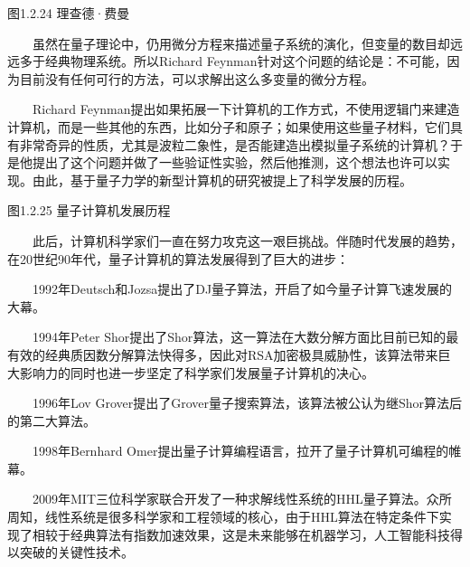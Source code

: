 \documentclass[a4paper,11pt,english]{sphinxmanual}
\begin{document}

\begin{center}图1.2.24 理查德·费曼
\end{center}
\sphinxAtStartPar
{}

\sphinxAtStartPar
  虽然在量子理论中，仍用微分方程来描述量子系统的演化，但变量的数目却远远多于经典物理系统。所以Richard Feynman针对这个问题的结论是：不可能，因为目前没有任何可行的方法，可以求解出这么多变量的微分方程。

\sphinxAtStartPar
{}

\sphinxAtStartPar
  Richard Feynman提出如果拓展一下计算机的工作方式，不使用逻辑门来建造计算机，而是一些其他的东西，比如分子和原子；如果使用这些量子材料，它们具有非常奇异的性质，尤其是波粒二象性，是否能建造出模拟量子系统的计算机？于是他提出了这个问题并做了一些验证性实验，然后他推测，这个想法也许可以实现。由此，基于量子力学的新型计算机的研究被提上了科学发展的历程。


\begin{center}图1.2.25 量子计算机发展历程
\end{center}
\sphinxAtStartPar
  此后，计算机科学家们一直在努力攻克这一艰巨挑战。伴随时代发展的趋势，在20世纪90年代，量子计算机的算法发展得到了巨大的进步：

\sphinxAtStartPar
  1992年Deutsch和Jozsa提出了D\sphinxhyphen{}J量子算法，开启了如今量子计算飞速发展的大幕。

\sphinxAtStartPar
  1994年Peter Shor提出了Shor算法，这一算法在大数分解方面比目前已知的最有效的经典质因数分解算法快得多，因此对RSA加密极具威胁性，该算法带来巨大影响力的同时也进一步坚定了科学家们发展量子计算机的决心。

\sphinxAtStartPar
  1996年Lov Grover提出了Grover量子搜索算法，该算法被公认为继Shor算法后的第二大算法。

\sphinxAtStartPar
  1998年Bernhard Omer提出量子计算编程语言，拉开了量子计算机可编程的帷幕。

\sphinxAtStartPar
  2009年MIT三位科学家联合开发了一种求解线性系统的HHL量子算法。众所周知，线性系统是很多科学家和工程领域的核心，由于HHL算法在特定条件下实现了相较于经典算法有指数加速效果，这是未来能够在机器学习，人工智能科技得以突破的关键性技术。
\end{document}
